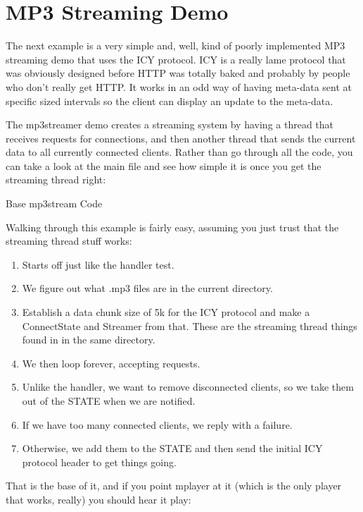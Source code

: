 \section{MP3 Streaming Demo}

The next example is a very simple and, well, kind of poorly implemented
MP3 streaming demo that uses the ICY protocol.  ICY is a really lame
protocol that was obviously designed before HTTP was totally baked
and probably by people who don't really get HTTP.  It works in an odd
way of having meta-data sent at specific sized intervals so the
client can display an update to the meta-data.

The mp3streamer demo creates a streaming system by
having a thread that receives requests for connections, and then
another thread that sends the current data to all currently connected
clients.  Rather than go through all the code, you can take a look
at the main file and see how simple it is once you get the
streaming thread right:

\begin{code}{Base mp3stream Code}
  
\end{code}

Walking through this example is fairly easy, assuming you just trust
that the streaming thread stuff works:

\begin{enumerate}
\item Starts off just like the handler test.
\item We figure out what .mp3 files are in the current directory.
\item Establish a data chunk size of 5k for the ICY protocol and
    make a ConnectState and Streamer from that.  These are the
    streaming thread things found in  in the same
    directory.
\item We then loop forever, accepting requests.
\item Unlike the handler, we want to remove disconnected clients,
    so we take them out of the STATE when we are notified.
\item If we have too many connected clients, we reply with a failure.
\item Otherwise, we add them to the STATE and then send the initial
    ICY protocol header to get things going.
\end{enumerate}


That is the base of it, and if you point mplayer at it (which is
the only player that works, really) you should hear it play:

